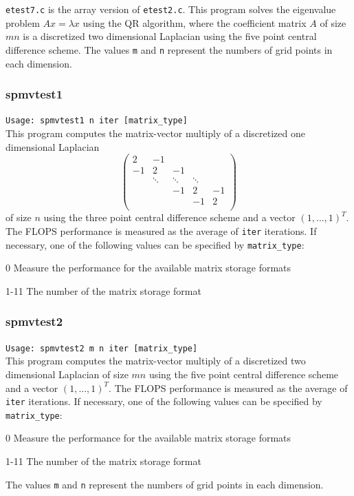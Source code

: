 \documentclass[a4paper]{article}
\newcommand{\namelistlabel}[1]{\mbox{#1}\hfill}
\newenvironment{namelist}[1]{%
\begin{list}{}
  {\let\makelabel\namelistlabel
  \settowidth{\labelwidth}{#1}
  \setlength{\leftmargin}{1.1\labelwidth}}
  }{%
\end{list}}
\begin{document}
{\tt etest7.c} is the array version of {\tt etest2.c}.
This program solves the eigenvalue problem $Ax = \lambda x$ using
the QR algorithm, where the 
coefficient matrix $A$ of size $mn$ is a discretized two dimensional Laplacian using the five
point central difference scheme. 
The values {\tt m} and {\tt n} represent the numbers of grid points
in each dimension. 

\subsubsection{spmvtest1}

\verb+Usage: spmvtest1 n iter [matrix_type]+\\

This program computes the matrix-vector multiply of a discretized one dimensional Laplacian
\[
\left(
\begin{array}{ccccc}
2 & -1 &   &  &   \\
-1 & 2 & -1 &  &   \\
  & \ddots  & \ddots  & \ddots  &   \\
  &   & -1 & 2 & -1 \\
  &   &   & -1 & 2 \\
\end{array}
\right)
\]
of size $n$ using the three point central difference scheme
and a vector $(1,\dots,1)^T$.
The FLOPS performance is measured as the average of {\tt iter}
iterations.
If necessary, one of the following values can be specified by {\tt matrix\_type}:
\begin{namelist}{XXXXXXXXXXXXXXXXXXXX}
\item[0] Measure the performance for the available matrix storage formats
\item[1-11] The number of the matrix storage format
\end{namelist}

\subsubsection{spmvtest2}

\verb+Usage: spmvtest2 m n iter [matrix_type]+\\

This program computes the matrix-vector multiply of a 
discretized two dimensional Laplacian of size $mn$ using 
the five point central difference scheme 
and a vector $(1,\dots,1)^T$. 
The FLOPS performance is measured as the average of {\tt iter}
iterations.
If necessary, one of the following values can be specified by {\tt matrix\_type}:
\begin{namelist}{XXXXXXXXXXXXXXXXXXXX}
\item[0] Measure the performance for the available matrix storage formats
\item[1-11] The number of the matrix storage format
\end{namelist}
The values {\tt m} and {\tt n} represent the numbers of grid points 
in each dimension. 
\end{document}
